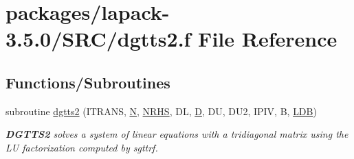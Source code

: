 \hypertarget{dgtts2_8f}{}\section{packages/lapack-\/3.5.0/\+S\+R\+C/dgtts2.f File Reference}
\label{dgtts2_8f}
\subsection*{Functions/\+Subroutines}
\begin{DoxyCompactItemize}
\item 
subroutine \hyperlink{group__doubleGTcomputational_gaeb6c61ebd5c7f9942cb364d6cb2ae1fb}{dgtts2} (I\+T\+R\+A\+N\+S, \hyperlink{polmisc_8c_a0240ac851181b84ac374872dc5434ee4}{N}, \hyperlink{example__user_8c_aa0138da002ce2a90360df2f521eb3198}{N\+R\+H\+S}, D\+L, \hyperlink{odrpack_8h_a7dae6ea403d00f3687f24a874e67d139}{D}, D\+U, D\+U2, I\+P\+I\+V, B, \hyperlink{example__user_8c_a50e90a7104df172b5a89a06c47fcca04}{L\+D\+B})
\begin{DoxyCompactList}\small\item\em {\bfseries D\+G\+T\+T\+S2} solves a system of linear equations with a tridiagonal matrix using the L\+U factorization computed by sgttrf. \end{DoxyCompactList}\end{DoxyCompactItemize}
